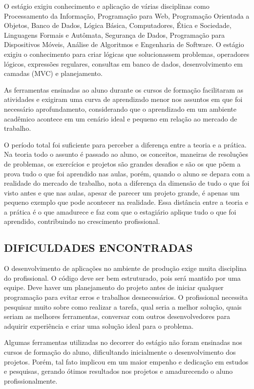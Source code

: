 \documentclass[
  12pt,				%
  openany,
  oneside,
  a4paper,			%
  english,			%
  brazil
]{article}
\numberwithin{figure}{section}
\numberwithin{table}{section}
\begin{document}
O estágio exigiu conhecimento e aplicação de várias disciplinas como Processamento da Informação, Programação para Web, Programação Orientada a Objetos, Banco de Dados, Lógica Básica, Computadores, Ética e Sociedade, Linguagens Formais e Autômata, Segurança de Dados, Programação para Dispositivos Móveis, Análise de Algoritmos e Engenharia de Software. O estágio exigiu o conhecimento para criar lógicas que solucionassem problemas,
operadores lógicos, expressões regulares, consultas em banco de dados, desenvolvimento em camadas (MVC) e planejamento.

As ferramentas ensinadas ao aluno durante os cursos de formação facilitaram as atividades e exigiram uma curva de aprendizado menor nos assuntos em que foi necessário aprofundamento, considerando que o aprendizado em um ambiente acadêmico acontece em um cenário ideal e pequeno em relação ao mercado de trabalho.

O período total foi suficiente para perceber a diferença entre a teoria e a prática. Na teoria todo o assunto é passado ao aluno, os conceitos, maneiras de resoluções de problemas, os exercícios e projetos são grandes desafios e são os que põem a prova tudo o que foi aprendido nas aulas, porém, quando o aluno se depara com a realidade do mercado de trabalho, nota a diferença da dimensão de tudo o que foi visto antes e que nas aulas, apesar de parecer um projeto grande, é apenas um pequeno exemplo que pode acontecer na realidade. Essa distância entre a teoria e a prática é o que amadurece e faz com que o estagiário aplique tudo o que foi aprendido, contribuindo no crescimento profissional.


\subsection{DIFICULDADES ENCONTRADAS}

O desenvolvimento de aplicações no ambiente de produção exige muita disciplina do profissional. O código deve ser bem estruturado, pois será mantido por uma equipe. Deve haver um planejamento do projeto antes de iniciar qualquer programação para evitar erros e trabalhos desnecessários. O profissional necessita pesquisar muito sobre como realizar a tarefa, qual seria a melhor solução, quais seriam as melhores ferramentas, conversar com outros desenvolvedores para adquirir experiência e criar uma solução ideal para o problema.

Algumas ferramentas utilizadas no decorrer do estágio não foram ensinadas nos cursos de formação do aluno, dificultando inicialmente o desenvolvimento dos projetos. Porém, tal fato implicou em um maior empenho e dedicação em estudos e pesquisas, gerando ótimos resultados nos projetos e amadurecendo o aluno profissionalmente.
\end{document}

